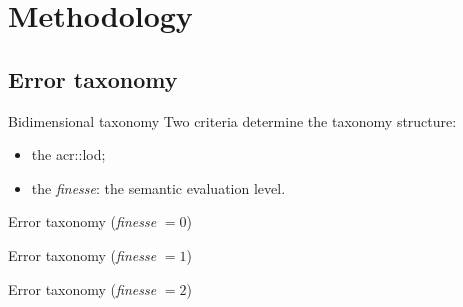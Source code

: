 \documentclass[export]{beamer}
\begin{document}
    \section{Methodology}
        \subsection{Error taxonomy}
            \begin{frame}{Bidimensional taxonomy}
                Two criteria determine the taxonomy structure:
                \begin{itemize}[label=$\blacktriangleright$, font=\color{IGNGreen}]
                    \item<1-> the \acrshort{acr::lod};
                    \item<2-> the \emph{finesse}: the semantic evaluation level.
                \end{itemize}
            \end{frame}
            \begin{frame}{Error taxonomy (\textit{finesse} $= 0$)}
                \begin{figure}
                    
                \end{figure}
            \end{frame}
            \begin{frame}{Error taxonomy (\textit{finesse} $= 1$)}
                \begin{figure}
                    
                \end{figure}
            \end{frame}
            \begin{frame}{Error taxonomy (\textit{finesse} $= 2$)}
                \begin{figure}
                    
                \end{figure}
            \end{frame}
\end{document}
